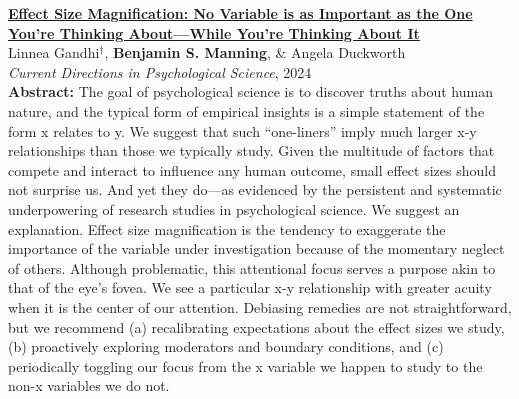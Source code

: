 \documentclass[11pt]{article}
\newenvironment{publist}
  {\begin{list}{}{%
    \setlength{\leftmargin}{1.5em}%
    \setlength{\itemindent}{-1.5em}%
    \setlength{\itemsep}{10pt}%
    \setlength{\parsep}{0pt}%
    \setlength{\topsep}{4pt}}}
  {\end{list}}
\begin{document}
\begin{publist}
\item \href{https://journals.sagepub.com/doi/full/10.1177/09637214241268222}{\textbf{Effect Size Magnification: No Variable is as Important as the One You're Thinking About---While You're Thinking About It}}\\
Linnea Gandhi$^\dagger$, \textbf{Benjamin S. Manning}, \& Angela Duckworth\\
\textit{Current Directions in Psychological Science}, 2024\\[3pt]
{\footnotesize \textbf{Abstract: }The goal of psychological science is to discover truths about human nature, and the typical form of empirical insights is a simple statement of the form x relates to y. We suggest that such ``one-liners'' imply much larger x-y relationships than those we typically study. Given the multitude of factors that compete and interact to influence any human outcome, small effect sizes should not surprise us. And yet they do---as evidenced by the persistent and systematic underpowering of research studies in psychological science. We suggest an explanation. Effect size magnification is the tendency to exaggerate the importance of the variable under investigation because of the momentary neglect of others. Although problematic, this attentional focus serves a purpose akin to that of the eye's fovea. We see a particular x-y relationship with greater acuity when it is the center of our attention. Debiasing remedies are not straightforward, but we recommend (a) recalibrating expectations about the effect sizes we study, (b) proactively exploring moderators and boundary conditions, and (c) periodically toggling our focus from the x variable we happen to study to the non-x variables we do not.}
\end{publist}
\end{document}
